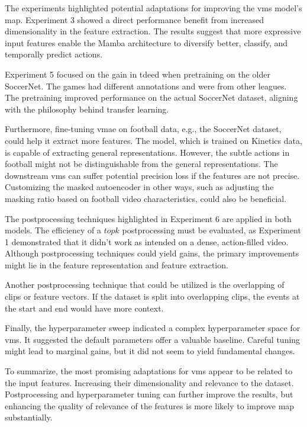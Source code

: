 The experiments highlighted potential adaptations for improving the \acrshort{vms} model's \acrshort{map}. Experiment 3 showed a direct performance benefit from increased dimensionality in the feature extraction. The results suggest that more expressive input features enable the Mamba architecture to diversify better, classify, and temporally predict actions. 

Experiment 5 focused on the gain in \acrshort{tdeed} when pretraining on the older SoccerNet. The games had different annotations and were from other leagues. The pretraining improved performance on the actual SoccerNet dataset, aligning with the philosophy behind transfer learning. 

Furthermore, fine-tuning \acrshort{vmae} on football data, e.g., the SoccerNet dataset, could help it extract more features. The model, which is trained on Kinetics data, is capable of extracting general representations. However, the subtle actions in football might not be distinguishable from the general representations. The downstream \acrshort{vms} can suffer potential precision loss if the features are not precise. Customizing the masked autoencoder in other ways, such as adjusting the masking ratio based on football video characteristics, could also be beneficial. 

The postprocessing techniques highlighted in Experiment 6 are applied in both models. The efficiency of a $topk$ postprocessing must be evaluated, as Experiment 1 demonstrated that it didn't work as intended on a dense, action-filled video. Although postprocessing techniques could yield gains, the primary improvements might lie in the feature representation and feature extraction. 

Another postprocessing technique that could be utilized is the overlapping of clips or feature vectors. If the dataset is split into overlapping clips, the events at the start and end would have more context. 

Finally, the hyperparameter sweep indicated a complex hyperparameter space for \acrshort{vms}. It suggested the default parameters offer a valuable baseline. Careful tuning might lead to marginal gains, but it did not seem to yield fundamental changes. 

To summarize, the most promising adaptations for \acrshort{vms} appear to be related to the input features. Increasing their dimensionality and relevance to the dataset.  Postprocessing and hyperparameter tuning can further improve the results, but enhancing the quality of relevance of the features is more likely to improve \acrshort{map} substantially.


